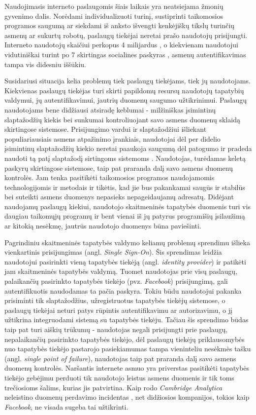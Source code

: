 Naudojimasis interneto paslaugomis šiais laikais yra neatsiejama žmonių gyvenimo dalis.
Norėdami individualizuoti turinį, sustiprinti taikomosios programos saugumą ar siekdami
iš anksto išvengti kenkėjiškų tikslų turinčių asmenų ar sukurtų robotų, paslaugų tiekėjai
neretai prašo naudotojų prisijungti. Interneto naudotojų skaičiui perkopus 4 milijardus \cite{InternetUsers2018},
o kiekvienam naudotojui vidutiniškai turint po 7 skirtingas socialines paskyras \cite{Mander2017}, asmenų
autentifikavimas tampa vis didesniu iššūkiu.

Susidariusi situacija kelia problemų tiek paslaugų tiekėjams, tiek jų naudotojams. Kiekvienas
paslaugų tiekėjas turi skirti papildomų resursų naudotojų tapatybių valdymui, jų autentifikavimui,
jautrių duomenų saugumo užtikrinimui. Paslaugų naudotojams bene didžiausi atsiradę keblumai - 
milžiniškas įsimintinų slaptažodžių kiekis bei sunkumai kontroliuojant savo asmens duomenų sklaidą
skirtingose sistemose. Prisijungimo vardui ir slaptažodžiui išliekant populiariausiais asmens atpažinimo
įrankiais, naudotojai dėl per didelio įsimintinų slaptažodžių kiekio neretai paaukoja saugumą dėl patogumo
ir pradeda naudoti tą patį slaptažodį sirtingoms sistemoms \cite{Pashalidis2003, Samar1999}. Naudotojas, turėdamas keletą
paskyrų skirtingose sistemose, taip pat praranda dalį savo asmens duomenų kontrolės. Jam tenka pasitikėti
taikomosios programos naudojamomis technologijomis ir metodais ir tikėtis, kad jie bus pakankamai saugūs
ir stabilūs bei suteikti asmens duomenys nepasieks nepageidaujamų adresatų. Didėjant naudojamų paslaugų kiekiui,
naudotojo skaitmeninės tapatybės duomenis turi vis daugiau taikomųjų programų ir bent vienai iš jų
patyrus programišių įsilaužimą ar kitokią nesėkmę, jautrūs naudotojo duomenys būna paviešinti. 

Pagrindiniu skaitmeninės tapatybės valdymo keliamų problemų sprendimu išlieka vienkartinis prisijungimas
 (angl. \textit{Single Sign-On}). Šis sprendimas leidžia naudotojui pasirinkti
vieną tapatybės tiekėją (angl. \textit{identity provider}) ir patikėti jam skaitmeninės tapatybės valdymą. Tuomet naudotojas prie visų
paslaugų, palaikančių pasirinkto tapatybės tiekėjo (pvz. \textit{Facebook}) prisijungimą, gali autentifikuotis naudodamas ta pačia paskyra. Tokiu
būdu naudotojui pakanka prisiminti tik slaptažodžius, užregistruotus tapatybės tiekėjų sistemose, o paslaugų
tiekėjai neturi patys rūpintis autentifikavimu ar autorizavimu, o jį užtikrina integruodami sistemą
su tapatybės tiekėju. Tačiau šis sprendimo būdas taip pat turi aiškių trūkumų - naudotojas negali prisijungti
prie paslaugų, nepalaikančių pasirinkto tapatybės tiekėjo, dėl paslaugų tiekėjų priklausomybės nuo tapatybės tiekėjo pastarojo pasiekiamumas
tampa vieninteliu nesėkmės tašku (angl. \textit{single point of failure}), naudotojas taip pat praranda dalį savo asmens duomenų kontrolės.
Naršantis internete asmuo yra priverstas pasitikėti tapatybės tiekėjo
gebėjimu perduoti tik naudotojo leistus asmens duomenis ir tik toms trečiosioms šalims, kurias jis patvirtina.
Kaip rodo \textit{Cambridge Analytica} neleistino duomenų perdavimo incidentas \cite{CambridgeAnalytica}, net didžiosios kompanijos, tokios
kaip \textit{Facebook}, ne visada sugeba tai užtikrinti.

